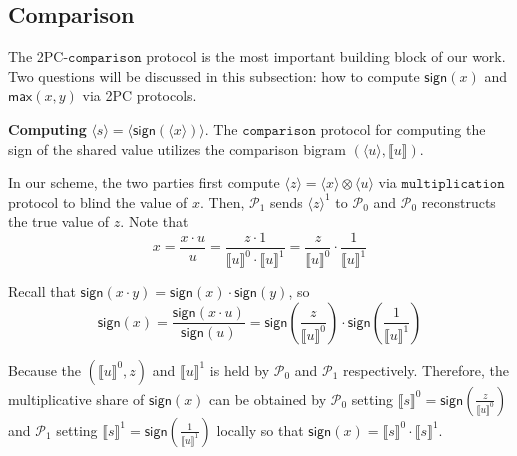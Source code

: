 \documentclass[letterpaper]{article} %
\begin{document}
    \subsection{Comparison}
    The 2PC-$\mathtt{comparison}$ protocol is the most important building block of our work.
    Two questions will be discussed in this subsection:
    how to compute $\mathsf{sign}(x)$ and $\mathsf{max}(x,y)$ via 2PC protocols.


    \textbf{Computing} $\langle s\rangle  = \langle \mathsf{sign}(\langle x\rangle)\rangle $.
    The $\mathtt{comparison}$ protocol for computing the sign of the shared value utilizes the comparison bigram $(\langle u\rangle,\llbracket u \rrbracket )$.

    In our scheme, the two parties first compute $ \langle z\rangle = \langle x\rangle\otimes \langle u\rangle$
    via $\mathtt{multiplication}$ protocol
    to blind the value of $x$.
    Then, $\mathcal{P}_{1}$ sends  $ \langle z\rangle^{1}$ to $\mathcal{P}_{0}$ and
    $\mathcal{P}_{0}$ reconstructs the true value of $z$.
    Note that
    $$x=\frac{x\cdot u}{u}
        =\frac{z\cdot 1}{\llbracket u \rrbracket^{0}\cdot \llbracket u \rrbracket^{1}}
        =\frac{z}{\llbracket u \rrbracket^{0}}\cdot\frac{1}{\llbracket u \rrbracket^{1}}$$

    Recall that $\mathsf{sign}(x\cdot y)=\mathsf{sign}(x)\cdot \mathsf{sign}(y)$, so
    $$\mathsf{sign}(x)=\frac{\mathsf{sign}(x \cdot u)}{\mathsf{sign}(u)}
    =\mathsf{sign}(\frac{z}{\llbracket u \rrbracket^{0}})
    \cdot \mathsf{sign}(\frac{1}{\llbracket u \rrbracket^{1}})$$

    Because the $(\llbracket u \rrbracket^{0},z)$ and $\llbracket u \rrbracket^{1}$
    is held by $\mathcal{P}_{0}$ and $\mathcal{P}_{1}$ respectively.
    Therefore, the multiplicative share of $\mathsf{sign}(x)$ can be obtained by
    $\mathcal{P}_{0}$ setting $\llbracket s \rrbracket^{0}
    =\mathsf{sign}(\frac{z}{\llbracket u \rrbracket^{0}})$
    and $\mathcal{P}_{1}$ setting $\llbracket s \rrbracket^{1}
    =\mathsf{sign}(\frac{1}{\llbracket u \rrbracket^{1}})$ locally
    so that $\mathsf{sign}(x)=\llbracket s \rrbracket^{0}\cdot \llbracket s \rrbracket^{1}$.
\end{document}

